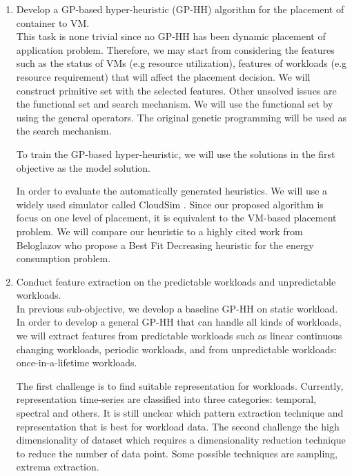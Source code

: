 \begin{enumerate}

	\item Develop a GP-based hyper-heuristic (GP-HH) algorithm for the placement of container to VM. \\
	 This task is none trivial since no GP-HH has been dynamic placement of application problem. Therefore, we may start from considering the features such as the status of VMs (e.g resource utilization), features of workloads (e.g resource requirement) that will affect the placement decision. We will construct primitive set with the selected features. Other unsolved issues are the functional set and search mechanism. We will use the functional set by using the general operators. The original genetic programming will be used as the search mechanism. 

	To train the GP-based hyper-heuristic, we will use the solutions in the first objective as the model solution. 

	In order to evaluate the automatically generated heuristics. We will use a widely used simulator called CloudSim \cite{2009LNCS.5931...24B}. Since our proposed algorithm is focus on one level of placement, it is equivalent to the VM-based placement problem. We will compare our heuristic to a highly cited work \cite{Beloglazov:2012ji} from Beloglazov who propose a Best Fit Decreasing heuristic for the energy consumption problem.

	\item Conduct feature extraction on the predictable workloads and unpredictable workloads. \\
	 In previous sub-objective, we develop a baseline GP-HH on static workload. In order to develop a general GP-HH that can handle all kinds of workloads, we will extract features from predictable workloads such as linear continuous changing workloads, periodic workloads, and from unpredictable workloads: once-in-a-lifetime workloads. 

	The first challenge is to find suitable representation for workloads. Currently, representation time-series are classified into three categories: temporal, spectral and others. It is still unclear which pattern extraction technique and representation that is best for workload data. The second challenge the high dimensionality of dataset which requires a dimensionality reduction technique to reduce the number of data point. Some possible techniques are sampling, extrema extraction.


\end{enumerate}
